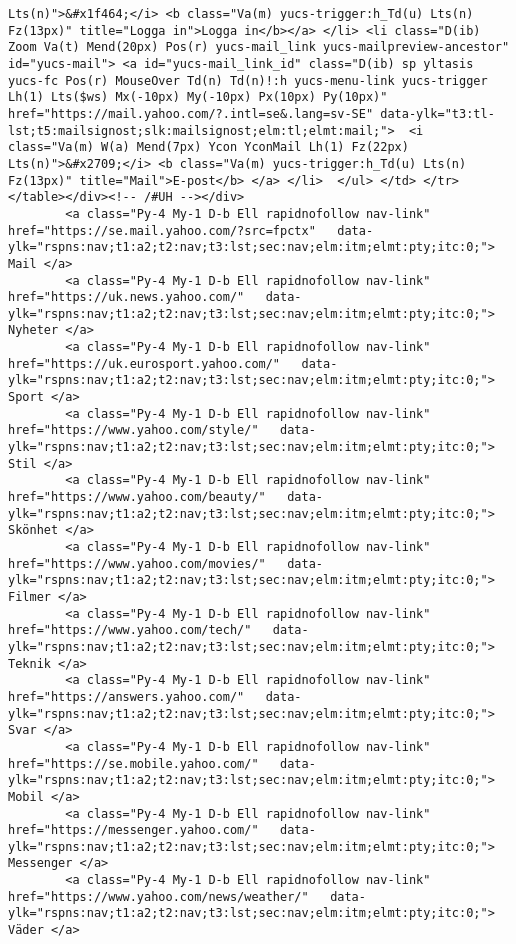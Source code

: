 \begin{verbatim}
Lts(n)">&#x1f464;</i> <b class="Va(m) yucs-trigger:h_Td(u) Lts(n) Fz(13px)" title="Logga in">Logga in</b></a> </li> <li class="D(ib) Zoom Va(t) Mend(20px) Pos(r) yucs-mail_link yucs-mailpreview-ancestor" id="yucs-mail"> <a id="yucs-mail_link_id" class="D(ib) sp yltasis yucs-fc Pos(r) MouseOver Td(n) Td(n)!:h yucs-menu-link yucs-trigger Lh(1) Lts($ws) Mx(-10px) My(-10px) Px(10px) Py(10px)" href="https://mail.yahoo.com/?.intl=se&.lang=sv-SE" data-ylk="t3:tl-lst;t5:mailsignost;slk:mailsignost;elm:tl;elmt:mail;">  <i class="Va(m) W(a) Mend(7px) Ycon YconMail Lh(1) Fz(22px) Lts(n)">&#x2709;</i> <b class="Va(m) yucs-trigger:h_Td(u) Lts(n) Fz(13px)" title="Mail">E-post</b> </a> </li>  </ul> </td> </tr> </table></div><!-- /#UH --></div> 
        <a class="Py-4 My-1 D-b Ell rapidnofollow nav-link" href="https://se.mail.yahoo.com/?src=fpctx"   data-ylk="rspns:nav;t1:a2;t2:nav;t3:lst;sec:nav;elm:itm;elmt:pty;itc:0;"> Mail </a>
        <a class="Py-4 My-1 D-b Ell rapidnofollow nav-link" href="https://uk.news.yahoo.com/"   data-ylk="rspns:nav;t1:a2;t2:nav;t3:lst;sec:nav;elm:itm;elmt:pty;itc:0;"> Nyheter </a>
        <a class="Py-4 My-1 D-b Ell rapidnofollow nav-link" href="https://uk.eurosport.yahoo.com/"   data-ylk="rspns:nav;t1:a2;t2:nav;t3:lst;sec:nav;elm:itm;elmt:pty;itc:0;"> Sport </a>
        <a class="Py-4 My-1 D-b Ell rapidnofollow nav-link" href="https://www.yahoo.com/style/"   data-ylk="rspns:nav;t1:a2;t2:nav;t3:lst;sec:nav;elm:itm;elmt:pty;itc:0;"> Stil </a>
        <a class="Py-4 My-1 D-b Ell rapidnofollow nav-link" href="https://www.yahoo.com/beauty/"   data-ylk="rspns:nav;t1:a2;t2:nav;t3:lst;sec:nav;elm:itm;elmt:pty;itc:0;"> Skönhet </a>
        <a class="Py-4 My-1 D-b Ell rapidnofollow nav-link" href="https://www.yahoo.com/movies/"   data-ylk="rspns:nav;t1:a2;t2:nav;t3:lst;sec:nav;elm:itm;elmt:pty;itc:0;"> Filmer </a>
        <a class="Py-4 My-1 D-b Ell rapidnofollow nav-link" href="https://www.yahoo.com/tech/"   data-ylk="rspns:nav;t1:a2;t2:nav;t3:lst;sec:nav;elm:itm;elmt:pty;itc:0;"> Teknik </a>
        <a class="Py-4 My-1 D-b Ell rapidnofollow nav-link" href="https://answers.yahoo.com/"   data-ylk="rspns:nav;t1:a2;t2:nav;t3:lst;sec:nav;elm:itm;elmt:pty;itc:0;"> Svar </a>
        <a class="Py-4 My-1 D-b Ell rapidnofollow nav-link" href="https://se.mobile.yahoo.com/"   data-ylk="rspns:nav;t1:a2;t2:nav;t3:lst;sec:nav;elm:itm;elmt:pty;itc:0;"> Mobil </a>
        <a class="Py-4 My-1 D-b Ell rapidnofollow nav-link" href="https://messenger.yahoo.com/"   data-ylk="rspns:nav;t1:a2;t2:nav;t3:lst;sec:nav;elm:itm;elmt:pty;itc:0;"> Messenger </a>
        <a class="Py-4 My-1 D-b Ell rapidnofollow nav-link" href="https://www.yahoo.com/news/weather/"   data-ylk="rspns:nav;t1:a2;t2:nav;t3:lst;sec:nav;elm:itm;elmt:pty;itc:0;"> Väder </a>

\end{verbatim}
